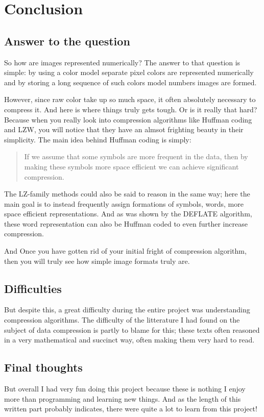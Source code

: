\begin{comment}
  
\end{comment}

\chapter{Conclusion}
\label{cha:conclus}

\section{Answer to the question}

So how are images represented numerically? The answer to that question
is simple: by using a color model separate pixel colors are
represented numerically and by storing a long sequence of such colors
model numbers images are formed.

However, since raw color take up so much space, it often absolutely
necessary to compress it. And here is where things truly gets
tough. Or is it really that hard? Because when you really look into
compression algorithms like Huffman coding and LZW, you will notice
that they have an almsot frighting beauty in their simplicity. The
main idea behind Huffman coding is simply:

\begin{quote}
  If we assume that some symbols are more frequent in the data, then
  by making these symbols more space efficient we can achieve
  significant compression.
\end{quote}

The LZ-family methods could also be said to reason in the same way;
here the main goal is to instead frequently assign formations of
symbols, words, more space efficient representations. And as was shown
by the DEFLATE algorithm, these word representation can also be
Huffman coded to even further increase compression.

And Once you have gotten rid of your initial fright of compression
algorithm, then you will truly see how simple image formats truly
are.

\section{Difficulties}

But despite this, a great difficulty during the entire project was
understanding compression algorithms. The difficulty of the
litterature I had found on the subject of data compression is partly
to blame for this; these texts often reasoned in a very mathematical
and succinct way, often making them very hard to read.


\section{Final thoughts}

But overall I had very fun doing this project because these is nothing
I enjoy more than programming and learning new things. And as the
length of this written part probably indicates, there were quite a lot
to learn from this project!  
